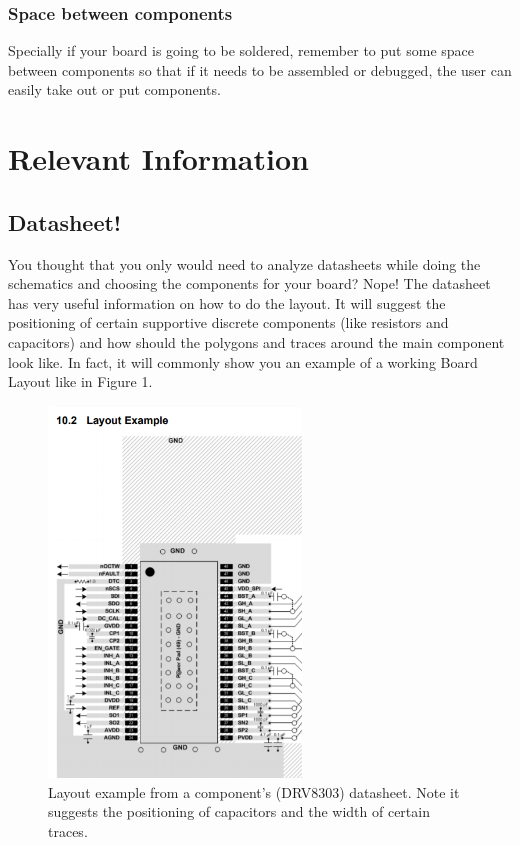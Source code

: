 \documentclass{article}
\begin{document}
\subsubsection{Space between components}
Specially if your board is going to be soldered, remember to put some space between components so that if it needs to be assembled or debugged, the user can easily take out or put components.
\pagebreak

\section{Relevant Information}
\subsection{Datasheet!}
You thought that you only would need to analyze datasheets while doing the schematics and choosing the components for your board? Nope! The datasheet has very useful information on how to do the layout. It will suggest the positioning of certain supportive discrete components (like resistors and capacitors) and how should the polygons and traces around the main component look like. In fact, it will commonly show you an example of a working Board Layout like in Figure 1.

\begin{figure}[ht]
	\center
	\includegraphics[width=0.6\textwidth, keepaspectratio]{images/layout.png}
	\caption{Layout example from a component's (DRV8303) datasheet. Note it suggests the positioning of capacitors and the width of certain traces.}
	\label{fig:layout}
\end{figure}
\end{document}
